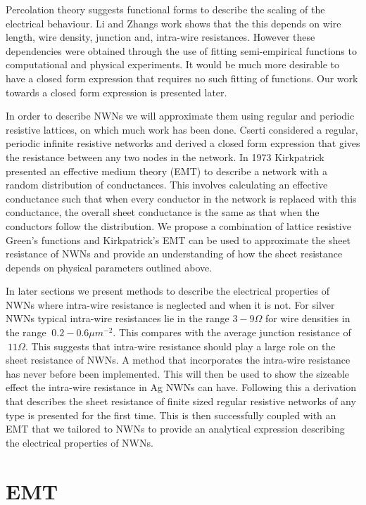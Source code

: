 Percolation theory suggests functional forms to describe the scaling of the electrical behaviour. Li and Zhangs work shows that the this depends on wire length, wire density, junction and, intra-wire resistances. However these dependencies were obtained through the use of fitting semi-empirical functions to computational and physical experiments. It would be much more desirable to have a closed form expression that requires no such fitting of functions. Our work towards a closed form expression is presented later.

In order to describe NWNs we will approximate them using regular and periodic resistive lattices, on which much work has been done. Cserti\cite{cserti2000} considered a regular, periodic infinite resistive networks and derived a closed form expression that gives the resistance between any two nodes in the network. In 1973 Kirkpatrick\cite{kirkpatrick1973} presented an effective medium theory (EMT) to describe a network with a random distribution of conductances. This involves calculating an effective conductance such that when every conductor in the network is replaced with this conductance, the overall sheet conductance is the same as that when the conductors follow the distribution. We propose a combination of lattice resistive Green's functions and Kirkpatrick's EMT can be used to approximate the sheet resistance of NWNs and provide an understanding of how the sheet resistance depends on physical parameters outlined above.

In later sections we present methods to describe the electrical properties of NWNs where intra-wire resistance is neglected and when it is not. For silver NWNs typical intra-wire resistances lie in the range $3-9 \Omega$ for wire densities in the range $~0.2-0.6 \mu m^{-2}$. This compares with the average junction resistance of $~11 \Omega$. This suggests that intra-wire resistance should play a large role on the sheet resistance of NWNs. A method that incorporates the intra-wire resistance has never before been implemented. This will then be used to show the sizeable effect the intra-wire resistance in Ag NWNs can have. Following this a derivation that describes the sheet resistance of finite sized regular resistive networks of any type is presented for the first time. This is then successfully coupled with an EMT that we tailored to NWNs to provide an analytical expression describing the electrical properties of NWNs.  
\section{EMT}

